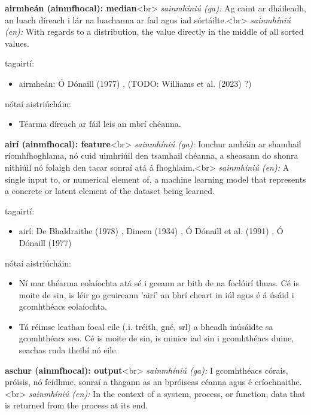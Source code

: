\documentclass{article}
\begin{document}
\textbf{airmheán (ainmfhocal): median}<br>
\textit{sainmhíniú (ga):} Ag caint ar dháileadh, an luach díreach i lár na luachanna ar fad agus iad sórtáilte.<br>
\textit{sainmhíniú (en):} With regards to a distribution, the value directly in the middle of all sorted values.

tagairtí:
\begin{itemize}
	\item airmheán: Ó Dónaill (1977) \cite{odonaill}, (TODO: Williams et al. (2023) \cite{storchiste}?)
\end{itemize}

nótaí aistriúcháin:
\begin{itemize}
	\item Téarma díreach ar fáil leis an mbrí chéanna.
\end{itemize}


\textbf{airí (ainmfhocal): feature}<br>
\textit{sainmhíniú (ga):} Ionchur amháin ar shamhail ríomhfhoghlama, nó cuid uimhriúil den tsamhail chéanna, a sheasann do shonra nithiúil nó folaigh den tacar sonraí atá á fhoghlaim.<br>
\textit{sainmhíniú (en):} A single input to, or numerical element of, a machine learning model that represents a concrete or latent element of the dataset being learned.

tagairtí:
\begin{itemize}
	\item airí: De Bhaldraithe (1978) \cite{de-bhaldraithe}, Dineen (1934) \cite{dineen}, Ó Dónaill et al. (1991) \cite{focloir-beag}, Ó Dónaill (1977) \cite{odonaill}
\end{itemize}

nótaí aistriúcháin:
\begin{itemize}
	\item Ní mar théarma eolaíochta atá sé i gceann ar bith de na foclóirí thuas. Cé is moite de sin, is léir go gcuireann 'airí' an bhrí cheart in iúl agus é á úsáid i gcomhthéacs eolaíochta.
	\item Tá réimse leathan focal eile (.i. tréith, gné, srl) a bheadh inúsáidte sa gcomhthéacs seo. Cé is moite de sin, is minice iad sin i gcomhthéacs duine, seachas ruda theibí nó eile.
\end{itemize}


\textbf{aschur (ainmfhocal): output}<br>
\textit{sainmhíniú (ga):} I gcomhthéacs córais, próisis, nó feidhme, sonraí a thagann as an bpróiseas céanna agus é críochnaithe.<br>
\textit{sainmhíniú (en):} In the context of a system, process, or function, data that is returned from the process at its end.
\end{document}
